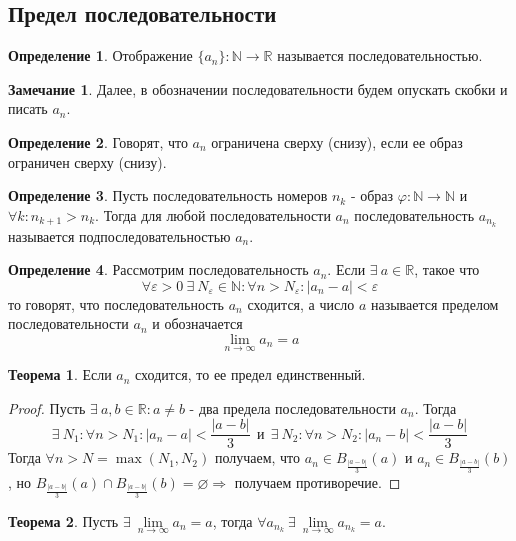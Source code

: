 \documentclass[a4paper, 12pt]{article}
\newcommand{\N}{\mathbb{N}}
\newcommand{\R}{\mathbb{R}}
\renewcommand{\phi}{\varphi}
\renewcommand{\epsilon}{\varepsilon}
\renewcommand{\emptyset}{\varnothing}
\newcommand{\lims}{\lim\limits_{n\to \infty}}
\theoremstyle{definition}
\newtheorem*{definition}{Определение}
\newtheorem*{theorem}{Теорема}
\newtheorem*{comm}{Замечание}
\begin{document}
    \subsection{Предел последовательности}
        \begin{definition}
            Отображение $\{a_n\}: \N\to \R$ называется последовательностью.
        \end{definition} 
        \begin{comm}
            Далее, в обозначении последовательности будем опускать скобки и писать $a_n$.
        \end{comm} 
        \begin{definition}
            Говорят, что $a_n$ ограничена сверху (снизу), если ее образ ограничен сверху (снизу).
        \end{definition} 
        \begin{definition}
            Пусть последовательность номеров $n_k$ - образ $\phi: \N\to \N$ и $\forall k: n_{k+1}>n_k$. Тогда для любой последовательности $a_n$ последовательность $a_{n_k}$ называется подпоследовательностью $a_n$.
        \end{definition} 
        \begin{definition}
            Рассмотрим последовательность $a_n$. Если $\exists \ a\in \R$, такое что 
            \[\forall \epsilon>0\ \exists\ N_{\epsilon}\in \N: \forall n>N_{\epsilon}: |a_n-a|<\epsilon\]
            то говорят, что последовательность $a_n$ сходится, а число $a$ называется пределом последовательности $a_n$ и обозначается
            \[\lim\limits_{n\to \infty} a_n=a\]
        \end{definition}
        \begin{theorem}
            Если $a_n$ сходится, то ее предел единственный.
        \end{theorem} 
        \begin{proof}
            Пусть $\exists\ a,b\in \R: a\ne b$ - два предела последовательности $a_n$. Тогда
            \[\exists\ N_1: \forall n>N_1: |a_n-a|<\frac{|a-b|}{3}\  \ \text{и}\ \ \exists\ N_2: \forall n>N_2: |a_n-b|<\frac{|a-b|}{3}\]
            Тогда $\forall n>N = \max{(N_1, N_2)}$ получаем, что $a_n\in B_{\frac{|a-b|}{3}}(a)$ и $a_n\in B_{\frac{|a-b|}{3}}(b)$, но $B_{\frac{|a-b|}{3}}(a)\cap B_{\frac{|a-b|}{3}}(b)= \emptyset \Rightarrow$ получаем противоречие.
        \end{proof} 
        \begin{theorem}
            Пусть $\exists\ \lims a_n=a$, тогда $\forall a_{n_k}\ \exists\ \lims a_{n_k}=a$.
        \end{theorem} 
\end{document}
